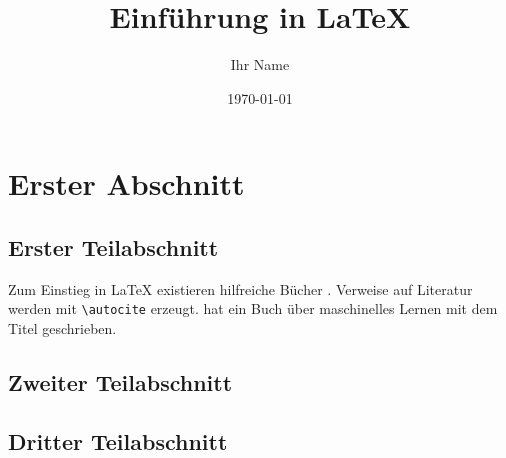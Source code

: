 \documentclass[twocolumn]{article}
\author{Ihr Name}
\date{\today}
\title{Einführung in \LaTeX}
\begin{document}
\maketitle

\tableofcontents

\section{Erster Abschnitt}

\subsection{Erster Teilabschnitt}

Zum Einstieg in \LaTeX{} existieren hilfreiche Bücher \autocite{oetiker_2022}. Verweise auf Literatur werden mit \verb|\autocite| erzeugt. \citeauthor{mitchell_machine_1997} hat \citeyear{mitchell_machine_1997} ein Buch über maschinelles Lernen mit dem Titel  geschrieben.

\subsection{Zweiter Teilabschnitt}

\lipsum[1-5]

\subsection{Dritter Teilabschnitt}

\lipsum[6-9]

\printbibliography
\end{document}
